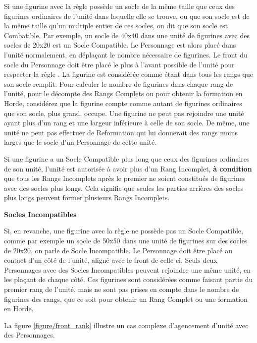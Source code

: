 Si une figurine avec la règle \frontrank{} possède un socle de la même taille que ceux des figurines ordinaires de l'unité dans laquelle elle se trouve, ou que son socle est de la même taille qu'un multiple entier de ces socles, on dit que son socle est Combatible. Par exemple, un socle de \unit{40x40}{\milli\meter} dans une unité de figurines avec des socles de \unit{20x20}{\milli\meter} est un Socle Compatible. Le Personnage est alors placé dans l'unité normalement, en déplaçant le nombre nécessaire de figurines. Le front du socle du Personnage doit être placé le plus à l'avant possible de l'unité pour respecter la règle \frontrank{}. La figurine est considérée comme étant dans tous les rangs que son socle remplit. Pour calculer le nombre de figurines dans chaque rang de l'unité, pour le décompte des Rangs Complets ou pour obtenir la formation en Horde, considérez que la figurine compte comme autant de figurines ordinaires que son socle, plus grand, occupe. Une figurine ne peut pas rejoindre une unité ayant plus d'un rang et une largeur inférieure à celle de son socle. De même, une unité ne peut pas effectuer de Reformation qui lui donnerait des rangs moins larges que le socle d'un Personnage de cette unité.

Si une figurine a un Socle Compatible plus long que ceux des figurines ordinaires de son unité, l'unité est autorisée à avoir plus d'un Rang Incomplet, \textbf{à condition} que tous les Rangs Incomplets après le premier ne soient constitués de figurines avec des socles plus longs. Cela signifie que seules les parties arrières des socles plus longs peuvent former plusieurs Rangs Incomplets.

\noindent\textbf{Socles Incompatibles}

Si, en revanche, une figurine avec la règle \frontrank{} ne possède pas un Socle Compatible, comme par exemple un socle de \unit{50x50}{\milli\meter} dans une unité de figurines sur des socles de \unit{20x20}{\milli\meter}, on parle de Socle Incompatible. Le Personnage doit être placé au contact d'un côté de l'unité, aligné avec le front de celle-ci. Seuls deux Personnages avec des Socles Incompatibles peuvent rejoindre une même unité, en les plaçant de chaque côté. Ces figurines sont considérées comme faisant partie du premier rang de l'unité, mais ne sont pas prises en compte dans le nombre de figurines des rangs, que ce soit pour obtenir un Rang Complet ou une formation en Horde.

La figure \ref{figure/front_rank} illustre un cas complexe d'agencement d'unité avec des Personnages.

